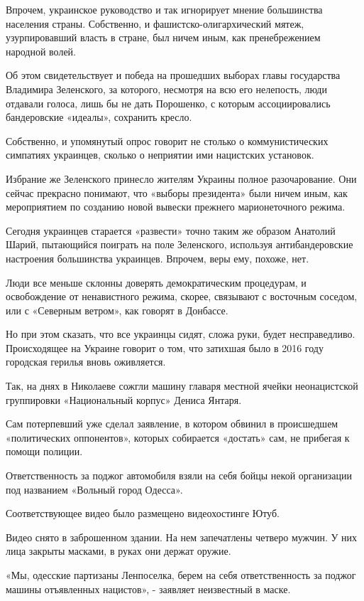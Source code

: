 \documentclass[a4paper,11pt]{extreport}
\begin{document}
Впрочем, украинское руководство и так игнорирует мнение большинства населения
страны. Собственно, и фашистско-олигархический мятеж, узурпировавший власть в
стране, был ничем иным, как пренебрежением народной волей.

Об этом свидетельствует и победа на прошедших выборах главы государства
Владимира Зеленского, за которого, несмотря на всю его нелепость, люди отдавали
голоса, лишь бы не дать Порошенко, с которым ассоциировались бандеровские
«идеалы», сохранить кресло.

Собственно, и упомянутый опрос говорит не столько о коммунистических симпатиях
украинцев, сколько о неприятии ими нацистских установок.

Избрание же Зеленского принесло жителям Украины полное разочарование. Они
сейчас прекрасно понимают, что «выборы президента» были ничем иным, как
мероприятием по созданию новой вывески прежнего марионеточного режима.

Сегодня украинцев старается «развести» точно таким же образом Анатолий Шарий,
пытающийся поиграть на поле Зеленского, используя антибандеровские настроения
большинства украинцев. Впрочем, веры ему, похоже, нет.

Люди все меньше склонны доверять демократическим процедурам, и освобождение от
ненавистного режима, скорее, связывают с восточным соседом, или с «Северным
ветром», как говорят в Донбассе.

Но при этом сказать, что все украинцы сидят, сложа руки, будет несправедливо.
Происходящее на Украине говорит о том, что затихшая было в 2016 году городская
герилья вновь оживляется.

Так, на днях в Николаеве сожгли машину главаря местной ячейки неонацистской
группировки «Национальный корпус» Дениса Янтаря.

Сам потерпевший уже сделал заявление, в котором обвинил в происшедшем
«политических оппонентов», которых собирается «достать» сам, не прибегая к
помощи полиции.

Ответственность за поджог автомобиля взяли на себя бойцы некой организации под
названием «Вольный город Одесса».

Соответствующее видео было размещено видеохостинге Ютуб.

Видео снято в заброшенном здании. На нем запечатлены четверо мужчин. У них лица
закрыты масками, в руках они держат оружие.

«Мы, одесские партизаны Ленпоселка, берем на себя ответственность за поджог
машины отъявленных нацистов», - заявляет неизвестный в маске.
\end{document}
